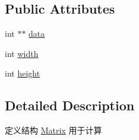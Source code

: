 \subsection*{Public Attributes}
\begin{DoxyCompactItemize}
\item 
int $\ast$$\ast$ \hyperlink{struct_matrix_afda04dbb307a169b4235dba98fb5b9df}{data}
\item 
int \hyperlink{struct_matrix_ad4320bd2dc03fd11887d3ba350c6c8ef}{width}
\item 
int \hyperlink{struct_matrix_a0b5614256a04ece0ea54b8aad7e6980c}{height}
\end{DoxyCompactItemize}


\subsection{Detailed Description}
定义结构 \hyperlink{struct_matrix}{Matrix} 用于计算 

